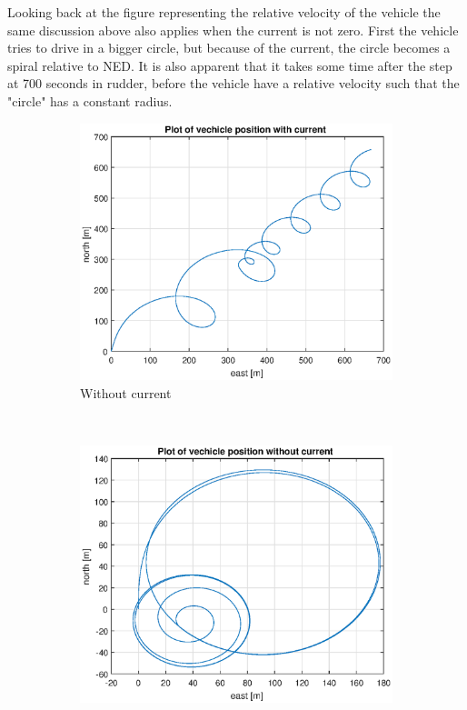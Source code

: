 Looking back at the figure representing the relative velocity of the vehicle the same discussion above also applies when the current is not zero. First the vehicle tries to drive in a bigger circle, but because of the current, the circle becomes a spiral relative to NED. It is also apparent that it takes some time after the step at 700 seconds in rudder, before the vehicle have a relative velocity such that the "circle" has a constant radius.

\begin{figure}[!ht]
	\centering
	\begin{subfigure}[b]{0.45\textwidth}
		\includegraphics[width=\textwidth]{figures/2_6_pos_cur}
		\caption{Without current}
		\label{fig:2_6_pos_without_current}
	\end{subfigure}
	~ %
	\begin{subfigure}[b]{0.45\textwidth}
		\includegraphics[width=\textwidth]{figures/2_6_pos}

\end{subfigure}
\end{figure}
